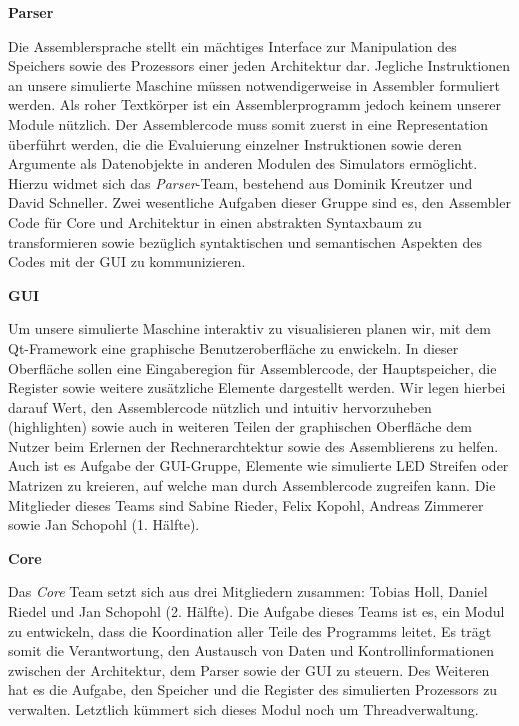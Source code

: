 \textbf{Parser}

Die Assemblersprache stellt ein mächtiges Interface zur Manipulation des
Speichers sowie des Prozessors einer jeden Architektur dar. Jegliche
Instruktionen an unsere simulierte Maschine müssen notwendigerweise in Assembler
formuliert werden. Als roher Textkörper ist ein Assemblerprogramm jedoch keinem
unserer Module nützlich. Der Assemblercode muss somit zuerst in eine
Representation überführt werden, die die Evaluierung einzelner Instruktionen
sowie deren Argumente als Datenobjekte in anderen Modulen des Simulators
ermöglicht. Hierzu widmet sich das \emph{Parser}-Team, bestehend aus Dominik
Kreutzer und David Schneller. Zwei wesentliche Aufgaben dieser Gruppe sind es,
den Assembler Code für Core und Architektur in einen abstrakten Syntaxbaum zu
transformieren sowie bezüglich syntaktischen und semantischen Aspekten des Codes
mit der GUI zu kommunizieren.

\textbf{GUI}

Um unsere simulierte Maschine interaktiv zu visualisieren planen wir, mit dem
Qt-Framework eine graphische Benutzeroberfläche zu enwickeln. In dieser
Oberfläche sollen eine Eingaberegion für Assemblercode, der Hauptspeicher, die
Register sowie weitere zusätzliche Elemente dargestellt werden. Wir legen
hierbei darauf Wert, den Assemblercode nützlich und intuitiv hervorzuheben
(highlighten) sowie auch in weiteren Teilen der graphischen Oberfläche dem
Nutzer beim Erlernen der Rechnerarchtektur sowie des Assemblierens zu
helfen. Auch ist es Aufgabe der GUI-Gruppe, Elemente wie simulierte LED Streifen
oder Matrizen zu kreieren, auf welche man durch Assemblercode zugreifen
kann. Die Mitglieder dieses Teams sind Sabine Rieder, Felix Kopohl, Andreas
Zimmerer sowie Jan Schopohl (1. Hälfte).

\textbf{Core}

Das \emph{Core} Team setzt sich aus drei Mitgliedern zusammen: Tobias Holl,
Daniel Riedel und Jan Schopohl (2. Hälfte). Die Aufgabe dieses Teams ist es, ein
Modul zu entwickeln, dass die Koordination aller Teile des Programms leitet. Es
trägt somit die Verantwortung, den Austausch von Daten und Kontrollinformationen
zwischen der Architektur, dem Parser sowie der GUI zu steuern. Des Weiteren hat
es die Aufgabe, den Speicher und die Register des simulierten Prozessors zu
verwalten. Letztlich kümmert sich dieses Modul noch um Threadverwaltung.
